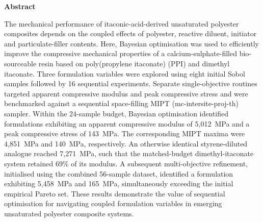 \begin{center}
    \begin{large}
        \textbf{Abstract}
    \end{large}
    \begin{justify}
        \begin{normalsize}
            The mechanical performance of itaconic-acid-derived unsaturated 
             polyester composites depends on the coupled effects of polyester,
             reactive diluent, initiator and particulate-filler contents.
            Here, Bayesian optimisation was used to efficiently improve the 
             compressive mechanical properties of a calcium-sulphate-filled 
             bio-sourceable resin based on poly(propylene itaconate) 
             (PPI) and dimethyl itaconate. 
            Three formulation variables were explored using eight initial
             Sobol samples followed by 16 sequential experiments.
            Separate single-objective routines targeted apparent compressive
             modulus and peak compressive stress and were benchmarked against
             a sequential space-filling MIPT (mc-intersite-proj-th) sampler.
            Within the 24-sample budget, Bayesian optimisation identified
             formulations exhibiting an apparent compressive modulus of 
             5,012~\unit{\mega\pascal} and a peak compressive stress of 
             143~\unit{\mega\pascal}. 
            The corresponding MIPT maxima were 4,851~\unit{\mega\pascal} 
             and 140~\unit{\mega\pascal}, respectively.
            An otherwise identical styrene-diluted analogue reached 
             7,271~\unit{\mega\pascal}, such that the matched-budget 
             dimethyl-itaconate system retained 69\% of its modulus.
            A subsequent multi-objective refinement, initialised using the
             combined 56-sample dataset, identified a formulation exhibiting 
             5,458~\unit{\mega\pascal} and 165~\unit{\mega\pascal}, 
             simultaneously exceeding the initial empirical Pareto set.
            These results demonstrate the value of sequential optimisation for
             navigating coupled formulation variables in emerging unsaturated 
             polyester composite systems.
        \end{normalsize}
    \end{justify}
\end{center}